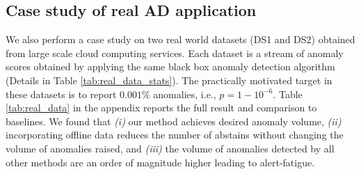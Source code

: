 \subsection{Case study of real AD application}

We also perform a case study on two real world datasets ({\ttfamily DS1} and {\ttfamily DS2}) obtained from large scale cloud computing services. Each dataset is a stream of anomaly scores obtained by applying the same black box anomaly detection algorithm (Details in Table \ref{tab:real_data_stats}). The practically motivated target in these datasets is to report $0.001\%$ anomalies, i.e., $p = 1-10^{-6}$.
Table \ref{tab:real_data} in the appendix reports the full result and comparison to baselines. We found that {\em(i)} our method achieves desired anomaly volume, {\em(ii)} incorporating offline data reduces the number of abstains without changing the volume of anomalies raised, and {\em(iii)} the volume of anomalies detected by all other methods are an order of magnitude higher leading to alert-fatigue. 

